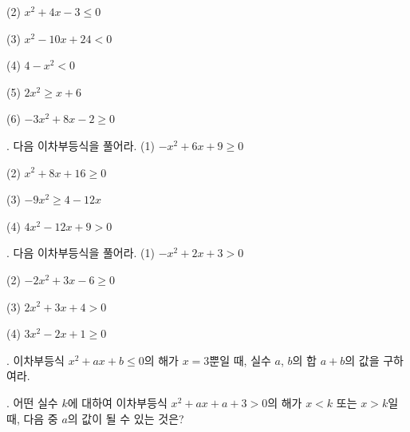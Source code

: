 \documentclass{article}
\begin{document}
\quad\:
(2) \(x^2+4x-3\le0\)

\quad\:
(3) \(x^2-10x+24<0\)

\quad\:
(4) \(4-x^2<0\)

\quad\:
(5) \(2x^2\ge x+6\)

\quad\:
(6) \(-3x^2+8x-2\ge0\)

.
다음 이차부등식을 풀어라.
\quad\:
(1) \(-x^2+6x+9\ge0\)

\quad\:
(2) \(x^2+8x+16\ge0\)

\quad\:
(3) \(-9x^2\ge4-12x\)

\quad\:
(4) \(4x^2-12x+9>0\)

.
다음 이차부등식을 풀어라.
\quad\:
(1) \(-x^2+2x+3>0\)

\quad\:
(2) \(-2x^2+3x-6\ge0\)

\quad\:
(3) \(2x^2+3x+4>0\)

\quad\:
(4) \(3x^2-2x+1\ge0\)

.
이차부등식 \(x^2+ax+b\le0\)의 해가 \(x=3\)뿐일 때, 실수 \(a\), \(b\)의 합 \(a+b\)의 값을 구하여라.

.
어떤 실수 \(k\)에 대하여 이차부등식 \(x^2+ax+a+3>0\)의 해가 \(x<k\) 또는 \(x>k\)일 때, 다음 중 \(a\)의 값이 될 수 있는 것은?
\end{document}
